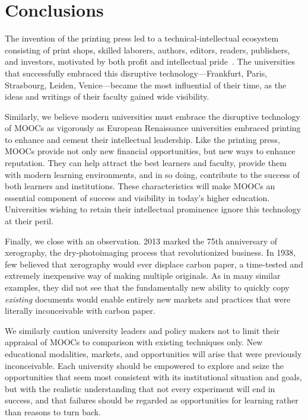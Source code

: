\section{Conclusions}

The invention of the printing press led to a technical-intellectual ecosystem consisting of print
shops, skilled laborers, authors, editors, readers, publishers, and investors, motivated by both
profit and intellectual pride~\cite{febvre}.  The universities that successfully embraced this
disruptive technology---Frankfurt, Paris, Strasbourg, Leiden, Venice---became the most influential
of their time, as the ideas and writings of their faculty gained wide visibility.

Similarly, we believe modern universities must embrace the disruptive technology of MOOCs as
vigorously as European Renaissance universities embraced printing to enhance and cement their
intellectual leadership.  Like the printing press, MOOCs provide not only new financial
opportunities,
but new ways to enhance reputation.  They can help attract the best learners and faculty, provide
them with modern learning environments, and in so doing, contribute to the success of both learners
and institutions.  These characteristics will make MOOCs an essential component of success and
visibility in today's higher education.  Universities wishing to retain their intellectual
prominence ignore this technology at their peril.

Finally, we close with an observation.  2013 marked the 75th anniversary of xerography, the
dry-photoimaging process that revolutionized business. In 1938, few believed that xerography would
ever displace carbon paper, a time-tested and extremely inexpensive way of making multiple
originals.  As in many similar examples, they did not see that the fundamentally new ability to
quickly copy \emph{existing} documents would enable entirely new markets and practices that were
literally inconceivable with carbon paper.

We similarly caution university leaders and policy makers not to limit their appraisal of MOOCs to
comparison with existing techniques only.  New educational modalities, markets, and opportunities
will arise that were previously inconceivable.  Each university should be empowered to explore and
seize the opportunities that seem most consistent with its institutional situation and goals, but
with the realistic understanding that not every experiment will end in success, and that failures
should be regarded as opportunities for learning rather than reasons to turn back.


